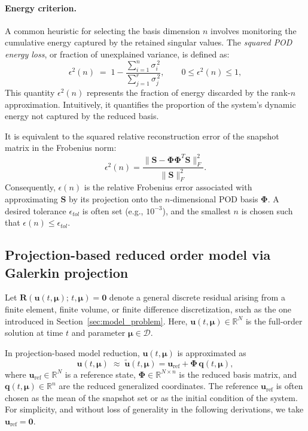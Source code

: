 \paragraph{Energy criterion.}
A common heuristic for selecting the basis dimension $n$ involves monitoring the cumulative energy captured by the retained singular values. The \emph{squared POD energy loss}, or fraction of unexplained variance, is defined as:
\begin{equation}
\label{eq:pod_energy_loss}
\epsilon^{2}(n)
\;=\;
1 - \frac{\displaystyle\sum_{i=1}^{n}\sigma_i^{\,2}}
         {\displaystyle\sum_{j=1}^{r}\sigma_j^{\,2}},
\qquad 0 \le \epsilon^{2}(n) \le 1,
\end{equation}
This quantity $\epsilon^2(n)$ represents the fraction of energy discarded by the rank-$n$ approximation. Intuitively, it quantifies the proportion of the system’s dynamic energy not captured by the reduced basis.

It is equivalent to the squared relative reconstruction error of the snapshot matrix in the Frobenius norm:
\begin{equation}
\epsilon^2(n) = \frac{\|\mathbf{S} - \boldsymbol{\Phi}\boldsymbol{\Phi}^{\!T}\mathbf{S}\|_F^2}{\|\mathbf{S}\|_F^2}.
\end{equation}
Consequently, $\epsilon(n)$ is the relative Frobenius error associated with approximating $\mathbf{S}$ by its projection onto the $n$-dimensional POD basis $\boldsymbol{\Phi}$. A desired tolerance $\epsilon_{tol}$ is often set (e.g., $10^{-3}$), and the smallest $n$ is chosen such that $\epsilon(n) \le \epsilon_{tol}$.


\subsection{Projection-based reduced order model via Galerkin projection}

Let $\mathbf{R}(\mathbf{u}(t,\boldsymbol{\mu});\,t,\boldsymbol{\mu}) = \mathbf{0}$ 
denote a general discrete residual arising from a finite element, finite volume, or finite difference discretization, such as the one introduced in Section~\ref{sec:model_problem}. 
Here, $\mathbf{u}(t,\boldsymbol{\mu}) \in \mathbb{R}^N$ is the full-order solution at time $t$ and parameter $\boldsymbol{\mu} \in \mathcal{D}$.

In projection-based model reduction, $\mathbf{u}(t,\boldsymbol{\mu})$ is approximated as
\begin{equation}
\mathbf{u}(t,\boldsymbol{\mu}) \;\approx\; 
\mathbf{\tilde{u}}(t,\boldsymbol{\mu}) 
= \mathbf{u}_{\text{ref}} + \boldsymbol{\Phi}\,\mathbf{q}(t,\boldsymbol{\mu}),
\end{equation}
where $\mathbf{u}_{\text{ref}} \in \mathbb{R}^N$ is a reference state, 
$\boldsymbol{\Phi} \in \mathbb{R}^{N \times n}$ is the reduced basis matrix, 
and $\mathbf{q}(t,\boldsymbol{\mu}) \in \mathbb{R}^n$ are the reduced generalized coordinates. 
The reference $\mathbf{u}_{\text{ref}}$ is often chosen as the mean of the snapshot set or as the initial condition of the system. 
For simplicity, and without loss of generality in the following derivations, 
we take $\mathbf{u}_{\text{ref}} = \mathbf{0}$.  

